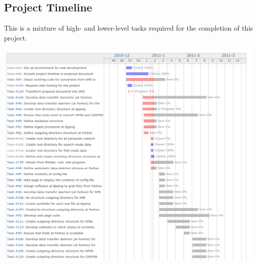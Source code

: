 \documentclass[a4paper,11pt]{article}
\begin{document}
\subsection{Project Timeline}
This is a mixture of high- and lower-level tasks required for the completion of this project.

\includegraphics[scale=0.4]{timeline.png}
\end{document}
